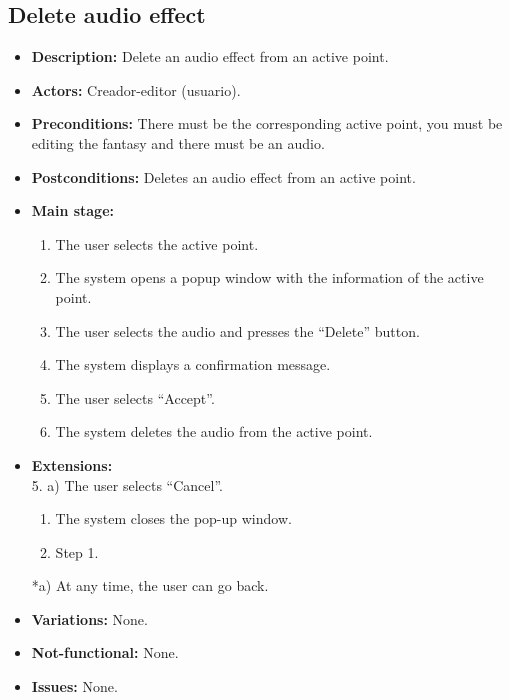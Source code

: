 \subsection{Delete audio effect}
\begin{itemize}
	\item \textbf{Description:} Delete an audio effect from an active point.
	\item \textbf{Actors:} Creador-editor (usuario).
	\item \textbf{Preconditions:} There must be the corresponding active point, you must be editing the fantasy and there must be an audio.
	\item \textbf{Postconditions:} Deletes an audio effect from an active point.
	\item \textbf{Main stage:}
	\begin{enumerate}
		\item The user selects the active point.
		\item The system opens a popup window with the information of the active point.
		\item The user selects the audio and presses the ``Delete'' button.
		\item The system displays a confirmation message.
		\item The user selects ``Accept''.
		\item The system deletes the audio from the active point.
	\end{enumerate}
	\item \textbf{Extensions:} \\ 5. a) The user selects ``Cancel''.
	\begin{enumerate}
		\item The system closes the pop-up window.
		\item Step 1.
	\end{enumerate}
	*a) At any time, the user can go back.
	\item \textbf{Variations:} None.
	\item \textbf{Not-functional:} None.
	\item \textbf{Issues:} None.
\end{itemize}


